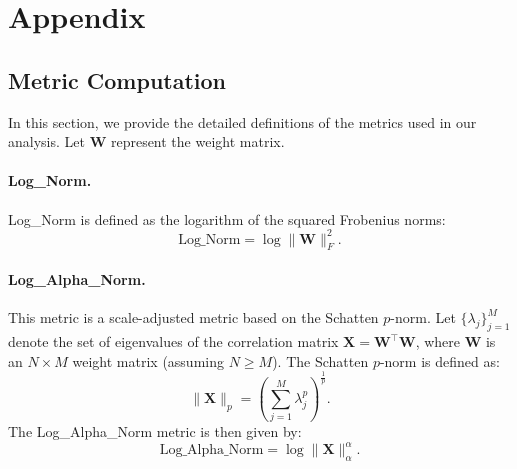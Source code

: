 \section{Appendix}\label{sec:appendix}

\subsection{Metric Computation}

In this section, we provide the detailed definitions of the metrics used in our analysis. 
Let $\mathbf{W}$ represent the weight matrix.




\paragraph{Log\_Norm.}
Log\_Norm is defined as the logarithm of the squared Frobenius norms:
\begin{equation}
    {\text{
    Log\_Norm}} = \log \|\mathbf{W}\|_F^2.
\end{equation}


\paragraph{Log\_Alpha\_Norm.}
This metric is a scale-adjusted metric based on the Schatten $p$-norm. Let $\{\lambda_j\}_{j=1}^M$ denote the set of eigenvalues of the correlation matrix $\mathbf{X} = \mathbf{W}^\top \mathbf{W}$, where $\mathbf{W}$ is an $N \times M$ weight matrix (assuming $N \ge M$). The Schatten $p$-norm is defined as:
\begin{equation}
    \|\mathbf{X}\|_p = \left( \sum_{j=1}^M \lambda_j^p \right)^{\frac{1}{p}}.
\end{equation}
The Log\_Alpha\_Norm metric is then given by:
\begin{equation}
    {\text{Log\_Alpha\_Norm}} =  \log \|\mathbf{X}\|_{\alpha}^{\alpha}.
\end{equation}


